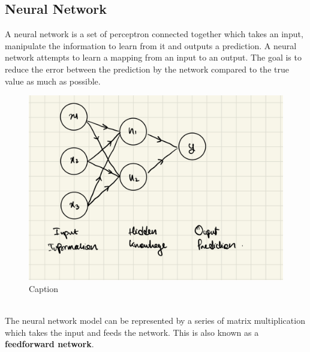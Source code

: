 \subsection{Neural Network}
A neural network is a set of perceptron connected together which takes an input, manipulate the information to learn from it and outputs a prediction. A neural network attempts to learn a mapping from an input to an output. The goal is to reduce the error between the prediction by the network compared to the true value as much as possible.
\begin{figure}[h]
  \centering
  \includegraphics[scale=0.15]{CHAPTER_2/c2_fig_neural_network_1.jpeg}
  \caption{Caption}
  \label{neural_network}
\end{figure}
\vspace{10mm} \\
The neural network model can be represented by a series of matrix multiplication which takes the input and feeds the network. This is also known as a \textbf{feedforward network}.
